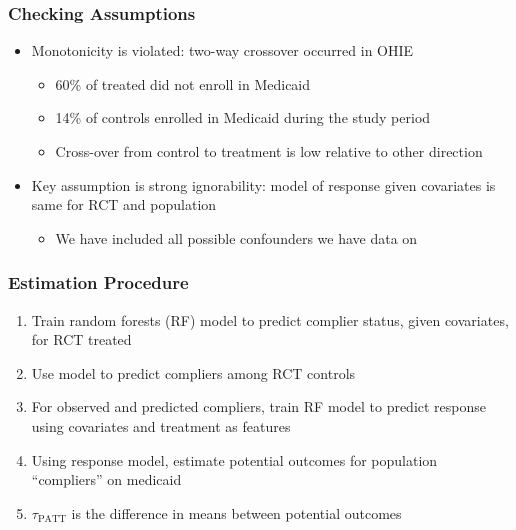 \documentclass{beamer}
\begin{document}
\begin{frame}
\frametitle{Checking Assumptions} 
\begin{itemize}
\item Monotonicity is violated: two-way crossover occurred in OHIE
\begin{itemize}
\item 60\% of treated did not enroll in Medicaid 
\item 14\% of controls enrolled in Medicaid during the study period
\item Cross-over from control to treatment is low relative to other direction
\end{itemize}
\item Key assumption is strong ignorability: model of response given covariates is same for RCT and population
\begin{itemize}
\item We have included all possible confounders we have data on
\end{itemize}
\end{itemize}
\end{frame}

\begin{frame} 
\frametitle{Estimation Procedure}
\begin{enumerate}
\item Train random forests (RF) model to predict complier status, given covariates, for RCT treated
\item Use model to predict compliers among RCT controls 
\item For observed and predicted compliers, train RF model to predict response using covariates and treatment as features
\item Using response model, estimate potential outcomes for population ``compliers'' on medicaid
\item $\tau_{\text{PATT}}$ is the difference in means between potential outcomes
\end{enumerate}
\end{frame}


\section[Results]{}
\end{document}
